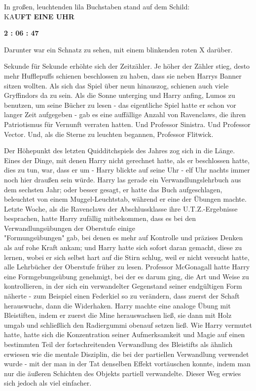 {In großen, leuchtenden lila Buchstaben stand auf dem Schild:\\

KA\textbf{UFT EINE UHR}

\textbf{2 : 06 : 47}

Darunter war ein Schnatz zu sehen, mit einem blinkenden roten X darüber.

Sekunde für Sekunde erhöhte sich der Zeitzähler. Je höher der Zähler stieg, desto mehr Hufflepuffs schienen beschlossen zu haben, dass sie neben Harrys Banner sitzen wollten. Als sich das Spiel über neun hinauszog, schienen auch viele Gryffindors da zu sein. Als die Sonne unterging und Harry anfing, Lumos zu benutzen, um seine Bücher zu lesen - das eigentliche Spiel hatte er schon vor langer Zeit aufgegeben - gab es eine auffällige Anzahl von Ravenclaws, die ihren Patriotismus für Vernunft verraten hatten. Und Professor Sinistra. Und Professor Vector. Und, als die Sterne zu leuchten begannen, Professor Flitwick.

Der Höhepunkt des letzten Quidditchspiels des Jahres zog sich in die Länge. Eines der Dinge, mit denen Harry nicht gerechnet hatte, als er beschlossen hatte, dies zu tun, war, dass er um - Harry blickte auf seine Uhr - elf Uhr nachts immer noch hier draußen sein würde. Harry las gerade ein Verwandlungslehrbuch aus dem sechsten Jahr; oder besser gesagt, er hatte das Buch aufgeschlagen, beleuchtet von einem Muggel-Leuchtstab, während er eine der Übungen machte. Letzte Woche, als die Ravenclaws der Abschlussklasse ihre U.T.Z.-Ergebnisse besprachen, hatte Harry zufällig mitbekommen, dass es bei den Verwandlungsübungen der Oberstufe einige\\ "Formungsübungen" gab, bei denen es mehr auf Kontrolle und präzises Denken als auf rohe Kraft ankam; und Harry hatte sich sofort daran gemacht, diese zu lernen, wobei er sich selbst hart auf die Stirn schlug, weil er nicht versucht hatte, alle Lehrbücher der Oberstufe früher zu lesen. Professor McGonagall hatte Harry eine Formgebungsübung genehmigt, bei der es darum ging, die Art und Weise zu kontrollieren, in der sich ein verwandelter Gegenstand seiner endgültigen Form näherte - zum Beispiel einen Federkiel so zu verändern, dass zuerst der Schaft herauswuchs, dann die Widerhaken. Harry machte eine analoge Übung mit Bleistiften, indem er zuerst die Mine herauswachsen ließ, sie dann mit Holz umgab und schließlich den Radiergummi obenauf setzen ließ. Wie Harry vermutet hatte, hatte sich die Konzentration seiner Aufmerksamkeit und Magie auf einen bestimmten Teil der fortschreitenden Verwandlung des Bleistifts als ähnlich erwiesen wie die mentale Disziplin, die bei der partiellen Verwandlung verwendet wurde - mit der man in der Tat denselben Effekt vortäuschen konnte, indem man nur die äußeren Schichten des Objekts partiell verwandelte. Dieser Weg erwies sich jedoch als viel einfacher.

}
